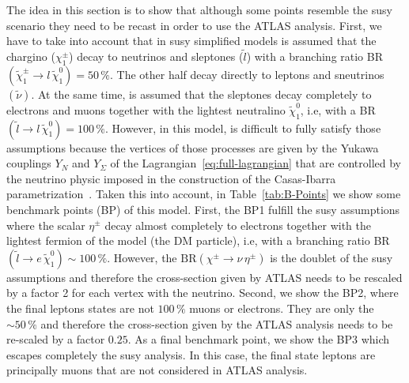 \documentclass[12pt,letterpaper]{article}
\begin{document}
The idea in this section is to show that although some points resemble the susy scenario they need to be recast in order to use the ATLAS analysis. 
First, we have to take into account that in susy simplified models is assumed that the chargino ($\chi_1^{\pm}$) decay to neutrinos and sleptones ($\tilde{l}$) with a branching ratio BR$(\tilde{\chi}_1^{\pm}\to l\,\tilde{\chi}_1^0)=50\,\%$. The other half decay directly to leptons and sneutrinos $(\tilde{\nu})$.
At the same time, is assumed that the sleptones decay completely to electrons and muons together with the lightest neutralino $\tilde{\chi}_1^0$, i.e, with a BR$(\tilde{l}\to l\,\tilde{\chi}_1^0)=100\,\%$.
However, in this model, is difficult to fully satisfy those assumptions because the vertices of those processes are given by the Yukawa couplings $Y_N$ and $Y_{\Sigma}$ of the Lagrangian~\ref{eq:full-lagrangian} that are controlled by the neutrino physic imposed in the construction of the Casas-Ibarra parametrization~\cite{Casas:2001sr, Ibarra:2003up}.
Taken this into account, in Table~\ref{tab:B-Points} we show some benchmark points (BP) of this model.
First, the BP1 fulfill the susy assumptions where the scalar $\eta^{\pm}$ decay almost completely to electrons together with the lightest fermion of the model (the DM particle), i.e, with a branching ratio BR$(\tilde{l}\to e\,\tilde{\chi}_1^0)\sim 100\,\%$. 
However, the $\text{BR}(\chi^{\pm}\to \nu\, \eta^{\pm})$ is the doublet of the susy assumptions and therefore the cross-section given by ATLAS needs to be rescaled by a factor 2 for each vertex with the neutrino.
Second, we show the BP2, where the final leptons states are not $100\,\%$ muons or electrons. They are only the $\sim50\,\%$ and therefore the cross-section given by the ATLAS analysis needs to be re-scaled by a factor 
$0.25$.
As a final benchmark point, we show the BP3 which escapes completely the susy analysis. In this case, the final state leptons are principally muons that are not considered in ATLAS analysis.
\end{document}
